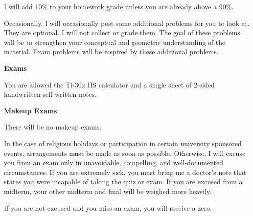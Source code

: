 \documentclass{article}
\begin{document}
I will add 10\% to your homework grade unless you are already above a 90\%.

Occasionally, I will occasionally post some additional problems for you to look
at. They are optional. I will not collect or grade them. The goal of these
problems will be to strengthen your conceptual and geometric understanding of
the material. Exam problems will be inspired by these additional problems.

\textbf{Exams}

You are allowed the Ti-30x IIS calculator and a single sheet of 2-sided
handwritten self written notes.

\textbf{Makeup Exams}

There will be no makeup exams.

In the case of religious holidays or participation in certain university
sponsored events, arrangements must be made as soon as possible. Otherwise, I
will excuse you from an exam only in unavoidable, compelling, and
well-documented circumstances. If you are extremely sick, you must bring me a
doctor's note that states you were incapable of taking the quiz or exam. If you
are excused from a midterm, your other midterm and final will be weighed more
heavily.

If you are not excused and you miss an exam, you will receive a zero.
\end{document}
